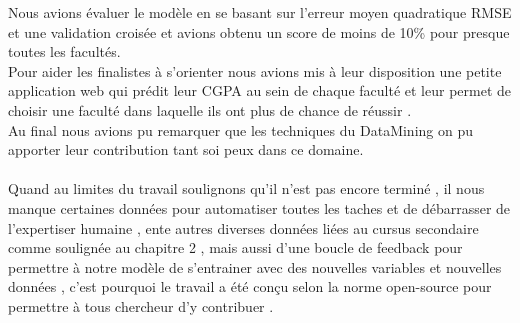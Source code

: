 Nous avions évaluer le modèle en se basant sur l'erreur moyen quadratique \ac{RMSE} et une validation croisée et avions obtenu un score de moins de 10\% pour presque toutes les facultés.\\
Pour aider les finalistes à s'orienter nous avions mis à leur disposition une petite application web  qui prédit leur \ac{CGPA} au sein de chaque faculté et leur permet de choisir une faculté dans laquelle ils ont plus de chance de réussir .\\
Au final nous avions pu remarquer que les techniques du DataMining on pu apporter leur contribution tant soi peux dans ce domaine. 
\paragraph{}
Quand au limites du travail soulignons qu'il n'est pas encore terminé , il nous manque certaines données pour automatiser toutes les taches et de débarrasser de l'expertiser humaine , ente autres diverses données liées au cursus secondaire comme soulignée au chapitre 2 ,  mais aussi d'une boucle de feedback pour permettre à notre modèle de s'entrainer avec des nouvelles variables et nouvelles données , c'est pourquoi le travail a été conçu selon la norme open-source pour permettre à tous chercheur d'y contribuer .